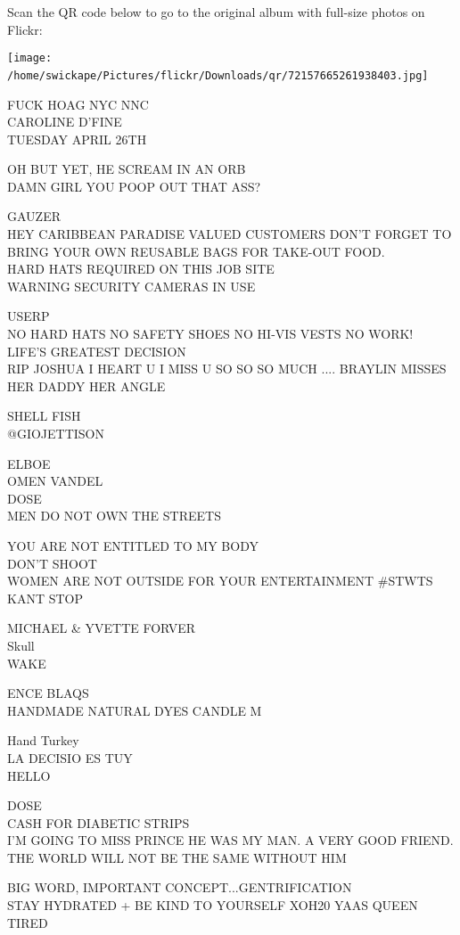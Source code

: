 \documentclass[10pt,letterpaper]{article}
\begin{document}
Scan the QR code below to go to the original album with full-size photos on Flickr:

\texttt{[image: /home/swickape/Pictures/flickr/Downloads/qr/72157665261938403.jpg]}
\

FUCK HOAG NYC NNC\\
CAROLINE D'FINE\\
TUESDAY APRIL 26TH

OH BUT YET, HE SCREAM IN AN ORB\\
DAMN GIRL YOU POOP OUT THAT ASS?

GAUZER\\
HEY CARIBBEAN PARADISE VALUED CUSTOMERS DON'T FORGET TO BRING YOUR OWN REUSABLE BAGS FOR TAKE{-}OUT FOOD.\\
HARD HATS REQUIRED ON THIS JOB SITE\\
WARNING SECURITY CAMERAS IN USE

USERP\\
NO HARD HATS NO SAFETY SHOES NO HI{-}VIS VESTS NO WORK!\\
LIFE'S GREATEST DECISION\\
RIP JOSHUA I HEART U I MISS U SO SO SO MUCH .... BRAYLIN MISSES HER DADDY HER ANGLE

SHELL FISH\\
@GIOJETTISON

ELBOE\\
OMEN VANDEL\\
DOSE\\
MEN DO NOT OWN THE STREETS

YOU ARE NOT ENTITLED TO MY BODY\\
DON'T SHOOT\\
WOMEN ARE NOT OUTSIDE FOR YOUR ENTERTAINMENT \#STWTS\\
KANT STOP

MICHAEL \& YVETTE FORVER\\
Skull\\
WAKE

ENCE BLAQS\\
HANDMADE NATURAL DYES CANDLE M

Hand Turkey\\
LA DECISIO ES TUY\\
HELLO

DOSE\\
CASH FOR DIABETIC STRIPS\\
I'M GOING TO MISS PRINCE HE WAS MY MAN.  A VERY GOOD FRIEND.  THE WORLD WILL NOT BE THE SAME WITHOUT HIM

BIG WORD, IMPORTANT CONCEPT...GENTRIFICATION\\
STAY HYDRATED + BE KIND TO YOURSELF XOH20 YAAS QUEEN\\
TIRED
\end{document}
